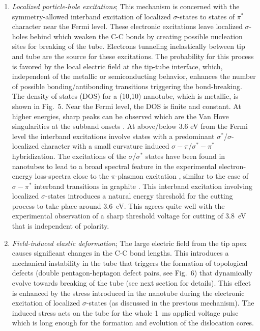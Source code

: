 \begin{multicols}{2}
\begin{enumerate}
\item{\it Localized particle-hole excitations}; This mechanism
is concerned with the symmetry-allowed interband excitation of
localized $\sigma$-states to states of $\pi^*$ character near the
Fermi level. These electronic excitations leave localized
$\sigma$-holes behind which weaken the C-C bonds by creating
possible nucleation sites for breaking of the tube. Electrons
tunneling inelastically between tip and tube are the source for
these excitations. The probability for this process is favored by
the local electric field at the tip-tube interface, which,
independent of the metallic or semiconducting behavior, enhances
the number of possible bonding/antibonding transitions triggering
the bond-breaking. The density of states (DOS) for a (10,10)
nanotube, which is metallic, is shown in Fig.~5. Near the Fermi
level, the DOS is finite and constant. At higher energies, sharp
peaks can be observed which are the Van Hove singularities at the
subband onsets \cite{stm_apa}. At above/below 3.6 eV from the
Fermi level the interband excitations involve states with a
predominant $\sigma^{\ast} $/$\sigma$-localized character with a
small curvature induced $\sigma -\pi $/$\sigma ^{\ast }-\pi ^{\ast }$ hybridization. The excitations of the $\sigma $/$\sigma ^{\ast }$ states have been found in nanotubes to lead to a broad spectral
feature in the experimental electron-energy loss-spectra close to
the $\pi$-plasmon excitation \cite{Pichler}, similar to the case
of $\sigma -\pi ^{\ast }$ interband transitions in graphite
\cite{book1}. This interband excitation involving localized
$\sigma $-states introduces a natural energy threshold for the
cutting process to take place around 3.6~eV. This agrees quite
well with the experimental observation of a sharp threshold
voltage for cutting of 3.8~eV that is independent of polarity.

\item{\it Field-induced elastic deformation};
The large electric field from the tip apex causes significant
changes in the C-C bond lengths. This introduces a mechanical
instability in the tube that triggers the formation of
topological defects (double pentagon-heptagon defect pairs, see
Fig.~6)\cite{SW,Vin} that dynamically evolve towards breaking of
the tube (see next section for details)\cite{jump_to_contact}.
This effect is enhanced by the stress introduced in the nanotube
during the electronic excitation of localized $\sigma$-states (as
discussed in the previous mechanism). The induced stress acts on
the tube for the whole 1~ms applied voltage pulse which is long
enough for the formation and evolution of the dislocation cores.
\end{enumerate}


\end{multicols}
